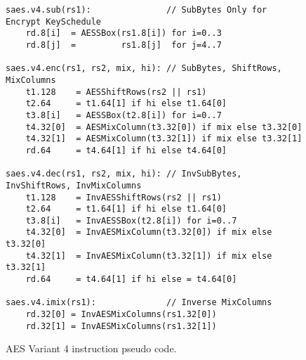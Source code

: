 \begin{figure}
\begin{lstlisting}[language=pseudo]
saes.v4.sub(rs1):               // SubBytes Only for Encrypt KeySchedule
    rd.8[i]  = AESSBox(rs1.8[i]) for i=0..3
    rd.8[j]  =         rs1.8[j]  for j=4..7

saes.v4.enc(rs1, rs2, mix, hi): // SubBytes, ShiftRows, MixColumns
    t1.128    = AESShiftRows(rs2 || rs1)
    t2.64     = t1.64[1] if hi else t1.64[0]
    t3.8[i]   = AESSBox(t2.8[i]) for i=0..7
    t4.32[0]  = AESMixColumn(t3.32[0]) if mix else t3.32[0]
    t4.32[1]  = AESMixColumn(t3.32[1]) if mix else t3.32[1]
    rd.64     = t4.64[1] if hi else t4.64[0]

saes.v4.dec(rs1, rs2, mix, hi): // InvSubBytes, InvShiftRows, InvMixColumns
    t1.128    = InvAESShiftRows(rs2 || rs1)
    t2.64     = t1.64[1] if hi else t1.64[0]
    t3.8[i]   = InvAESSBox(t2.8[i]) for i=0..7
    t4.32[0]  = InvAESMixColumn(t3.32[0]) if mix else t3.32[0]
    t4.32[1]  = InvAESMixColumn(t3.32[1]) if mix else t3.32[1]
    rd.64     = t4.64[1] if hi else = t4.64[0]

saes.v4.imix(rs1):              // Inverse MixColumns
    rd.32[0] = InvAESMixColumns(rs1.32[0])
    rd.32[1] = InvAESMixColumns(rs1.32[1])
\end{lstlisting}
\caption{AES Variant 4 instruction pseudo code.}
\label{fig:pesudo:aes:v4}
\end{figure}

